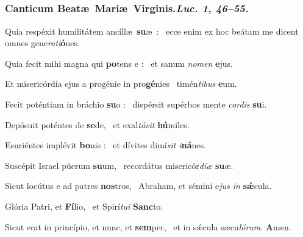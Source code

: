 \documentclass[12pt]{article} %
\newenvironment{psalmtext}{\leftskip 0.25in}{\vspace{2 mm}}
\let\oldgresixstar\gresixstar
\renewcommand{\gresixstar}{\textcolor{benred8}{\oldgresixstar}}
\def\capitulumSpace{\hspace{20 mm}}
\begin{document}
\subsection*{}

\subsubsection*{Canticum Beat\ae\ Mari\ae\ Virginis.\capitulumSpace \emph{Luc. 1, 46--55.}}


\gresetfirstlineaboveinitial{\small \textsc{ \textbf{\textcolor{benred8}{VIII G}}}}{\small \textsc{ \textbf{\textcolor{benred8}{VIII G}}}}

\begin{psalmtext}
Quia resp\'{e}xit humilit\'{a}tem anc\'{i}ll\ae\ \textbf{su}\ae\ : \gresixstar\ ecce enim ex hoc be\'{a}tam me dicent omnes gene\emph{rati}\textbf{\'{o}}nes.

Quia fecit mihi magna qui \textbf{po}tens e : \gresixstar\ et sanum \emph{nomen} \textbf{e}jus.

Et miseric\'{o}rdia ejus a prog\'{e}nie in pro\textbf{g\'{e}}nies \gresixstar\ tim\'{e}n\emph{tibus} \textbf{e}um.

Fecit pot\'{e}ntiam in br\'{a}chio \textbf{su}o : \gresixstar\ disp\'{e}rsit sup\'{e}rbos mente \emph{cordis} \textbf{su}i.

Dep\'{o}suit pot\'{e}ntes de \textbf{se}de, \gresixstar\ et exal\emph{t\'{a}vit} \textbf{h\'{u}}miles.

Esuri\'{e}ntes impl\'{e}vit \textbf{bo}nis : \gresixstar\ et d\'{i}vites dim\'{i}\emph{sit i}\textbf{n\'{a}}nes.

Susc\'{e}pit Israel p\'{u}erum \textbf{su}um, \gresixstar\ record\'{a}tus miseric\'{o}r\emph{di\ae} \textbf{su}\ae.

Sicut loc\'{u}tus e ad patres \textbf{nos}tros, \gresixstar\ Abraham, et s\'{e}mini e\emph{jus in} \textbf{s\'{\ae}}cula.

Glória Patri, et \textbf{Fí}lio, \gresixstar\ et Spirí\emph{tui} \textbf{Sanc}to.

Sicut erat in princípio, et nunc, et \textbf{sem}per, \gresixstar\ et in sǽcula sæcu\emph{lórum}. \textbf{A}men.

\end{psalmtext}
\end{document}
